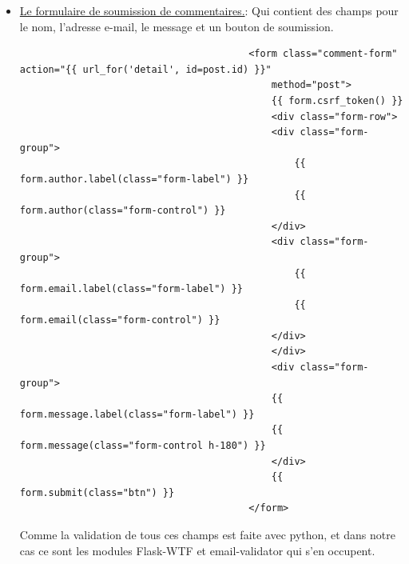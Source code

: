 \documentclass[a4paper,11pt]{article}
\begin{document}
\begin{enumerate}
                        \begin{itemize}
                            \item \underline{Le formulaire de soumission de commentaires.}: Qui contient des champs pour le nom, l'adresse e-mail, le message et un bouton de soumission.
                                \begin{tcolorbox}[colback=lightgray!6, colframe=black, left=-70mm, right=5mm, top=2mm, bottom=0mm, boxrule=0.1mm]
                                    \begin{verbatim}
                                        <form class="comment-form" action="{{ url_for('detail', id=post.id) }}" 
                                            method="post">
                                            {{ form.csrf_token() }}
                                            <div class="form-row">
                                            <div class="form-group">
                                                {{ form.author.label(class="form-label") }}
                                                {{ form.author(class="form-control") }}
                                            </div>
                                            <div class="form-group">
                                                {{ form.email.label(class="form-label") }}
                                                {{ form.email(class="form-control") }}
                                            </div>
                                            </div>
                                            <div class="form-group">
                                            {{ form.message.label(class="form-label") }}
                                            {{ form.message(class="form-control h-180") }}
                                            </div>
                                            {{ form.submit(class="btn") }}
                                        </form>
                                    \end{verbatim}
                                \end{tcolorbox}

                                \noindent Comme la validation de tous ces champs est faite avec python, et dans notre cas ce sont les modules Flask-WTF et email-validator qui s'en occupent.


\end{itemize}
\end{enumerate}
\end{document}
